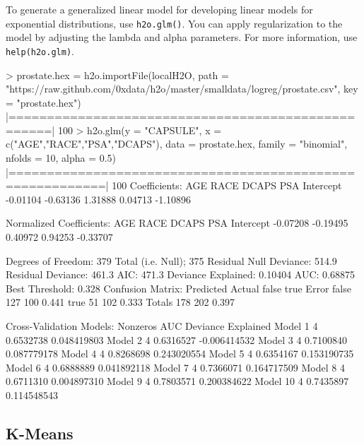 \documentclass[11pt]{article}
\begin{document}
To generate a generalized linear model for developing linear models for exponential distributions, use {\texttt{h2o.glm()}}. You can apply regularization to the model by adjusting the lambda and alpha parameters. 
For more information, use {\texttt{help(h2o.glm)}}.
\begin{spverbatim}
> prostate.hex = h2o.importFile(localH2O, path =
"https://raw.github.com/0xdata/h2o/master/smalldata/logreg/prostate.csv",
key = "prostate.hex")
       |===================================================| 100%
> h2o.glm(y = "CAPSULE", x = c("AGE","RACE","PSA","DCAPS"), data =
prostate.hex, family = "binomial", nfolds = 10, alpha = 0.5)
 |==========================================================| 100%
     Coefficients:
    AGE      RACE     DCAPS       PSA Intercept
       -0.01104  -0.63136   1.31888   0.04713  -1.10896

      Normalized Coefficients:
    AGE      RACE     DCAPS       PSA Intercept
       -0.07208  -0.19495   0.40972   0.94253  -0.33707

      Degrees of Freedom: 379 Total (i.e. Null);  375 Residual
      Null Deviance:     514.9
      Residual Deviance: 461.3  AIC: 471.3
      Deviance Explained: 0.10404
      AUC: 0.68875  Best Threshold: 0.328
    	Confusion Matrix:
      Predicted
      Actual   false true Error
      false    127  100 0.441
      true      51  102 0.333
      Totals   178  202 0.397

      Cross-Validation Models:
       Nonzeros       AUC Deviance Explained
      Model 1         4 0.6532738        0.048419803
      Model 2         4 0.6316527       -0.006414532
      Model 3         4 0.7100840        0.087779178
      Model 4         4 0.8268698        0.243020554
      Model 5         4 0.6354167        0.153190735
      Model 6         4 0.6888889        0.041892118
      Model 7         4 0.7366071        0.164717509
      Model 8         4 0.6711310        0.004897310
      Model 9         4 0.7803571        0.200384622
      Model 10        4 0.7435897        0.114548543
\end{spverbatim}

\subsection{K-Means}
\end{document}
